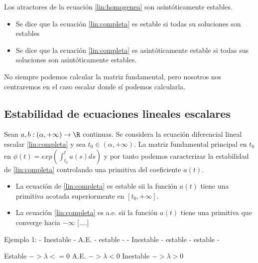\begin{ncor}
Los atractores de la ecuación \ref{lin:homogenea} son asintóticamente estables.
\end{ncor}

\begin{ndef}
\begin{itemize}
\item Se dice que la ecuación \ref{lin:completa} es estable si todas su soluciones son estables
\item Se dice que la ecuación \ref{lin:completa} es asintóticamente estable si todas sus soluciones son asintóticamente estables.
\end{itemize}
\end{ndef}

No siempre podemos calcular la matriz fundamental, pero nosotros nos centraremos en el caso escalar donde sí podemos calcularla.

\subsection{Estabilidad de ecuaciones lineales escalares}
Sean $a,b:(\alpha,+\infty)\to \R$ continuas. Se considera la ecuación diferencial lineal escalar \ref{lin:completa} y sea $t_0\in(\alpha,+\infty)$.
La matriz fundamental principal en $t_0$ en $\phi(t)=exp(\int^t_{t_0} a(s)ds)$ y por tanto podemos caracterizar la estabilidad de \ref{lin:completa} controlando una primitiva del coeficiente $a(t)$.
\begin{nprop}
\begin{itemize}
\item La ecuación de \ref{lin:completa} es estable sii la función $a(t)$ tiene una primitiva acotada superiormente en $[t_0,+\infty]$.
\item La ecuación \ref{lin:completa} es a.e. sii la función $a(t)$ tiene una primitiva que converge hacia $-\infty$ [....]
\end{itemize}
\end{nprop}
Ejemplo 1:
- Inestable
- A.E.
- estable
-
- Inestable
- estable
- estable
-


Estable $-> \lambda <= 0$
A.E. $-> \lambda < 0$
Inestable $-> \lambda > 0$

